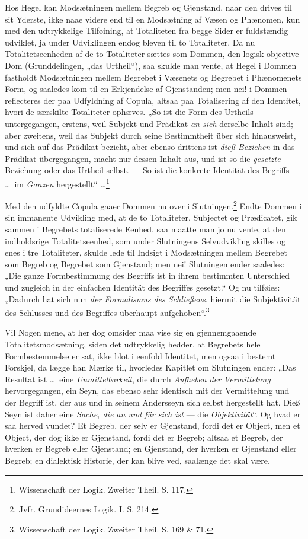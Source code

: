 \documentclass[12pt]{book}
\newcommand{\opage}[1]{\marginnote{\footnotesize\textit{[#1]}}}
\begin{document}
Hos Hegel kan Modsætningen mellem Begreb og Gjenstand,
naar den drives til sit Yderste, ikke naae videre end til
en Modsætning af Væsen og Phænomen, kun med den udtrykkelige
Tilføining, at Totaliteten fra begge Sider er fuldstændig
udviklet, ja under Udviklingen endog bleven til to
Totaliteter. Da nu Totalitetseenheden af de to Totaliteter
sættes som Dommen, den logisk objective Dom (Grunddelingen,
„das Urtheil“), saa skulde man vente, at Hegel i Dommen
fastholdt Modsætningen mellem Begrebet i Væsenets og Begrebet
i Phænomenets Form, og saaledes kom til en Erkjendelse
af Gjenstanden; men nei! i Dommen reflecteres der
paa Udfyldning af Copula, altsaa paa Totalisering af den
Identitet, hvori de særskilte Totaliteter ophæves. „So ist die
Form des Urtheils untergegangen, erstens, weil Subjekt und
Prädikat \emph{an sich} derselbe Inhalt sind; aber zweitens, weil das
Subjekt durch seine Bestimmtheit über sich hinausweist, und
sich auf das Prädikat bezieht, aber ebenso drittens ist \emph{dieß
Beziehen} in das Prädikat übergegangen, macht nur dessen Inhalt
aus, und ist so die \emph{gesetzte} Beziehung oder das Urtheil
selbst. --- So ist die konkrete Identität des Begriffs \dots\ im
\emph{Ganzen} hergestellt“ \dots\footnote{Wissenschaft der Logik. Zweiter Theil. S. 117.} %

Med den udfyldte Copula gaaer Dommen nu over i
\opage{134}Slutningen.\footnote{Jvfr. Grundideernes Logik. I. S. 214.} %
Endte Dommen i sin immanente Udvikling
med, at de to Totaliteter, Subjectet og Prædicatet, gik sammen
i Begrebets totaliserede Eenhed, saa maatte man jo nu vente,
at den indholdsrige Totalitetseenhed, som under Slutningens
Selvudvikling skilles og enes i tre Totaliteter, skulde lede til
Indsigt i Modsætningen mellem Begrebet som Begreb og Begrebet
som Gjenstand; men nei! Slutningen ender saaledes:
„Die ganze Formbestimmung des Begriffs ist in ihrem bestimmten
Unterschied und zugleich in der einfachen Identität
des Begriffes gesetzt.“ Og nu tilføies: „Dadurch hat sich nun
\emph{der Formalismus des Schließens}, hiermit die Subjektivität
des Schlusses und des Begriffes überhaupt aufgehoben“.\footnote{Wissenschaft der Logik. Zweiter Theil. S. 169 \& 71.} %

Vil Nogen mene, at her dog omsider maa vise sig en
gjennemgaaende Totalitetsmodsætning, siden det udtrykkelig
hedder, at Begrebets hele Formbestemmelse er sat, ikke blot i
eenfold Identitet, men ogsaa i bestemt Forskjel, da lægge han
Mærke til, hvorledes Kapitlet om Slutningen ender: „Das
Resultat ist \dots\ eine \emph{Unmittelbarkeit}, die durch \emph{Aufheben
der Vermittelung} hervorgegangen, ein Seyn, das ebenso
sehr identisch mit der Vermittelung und der Begriff ist, der
aus und in seinem Andersseyn sich selbst hergestellt hat. Dieß
Seyn ist daher eine \emph{Sache, die an und für sich ist} --- die
\emph{Objektivität}“. Og hvad er saa herved vundet? Et Begreb,
der selv er Gjenstand, fordi det er Object, men et Object,
der dog ikke er Gjenstand, fordi det er Begreb; altsaa
et Begreb, der hverken er Begreb eller Gjenstand; en Gjenstand,
der hverken er Gjenstand eller Begreb; en dialektisk
Historie, der kan blive ved, saalænge det skal være.
\end{document}
